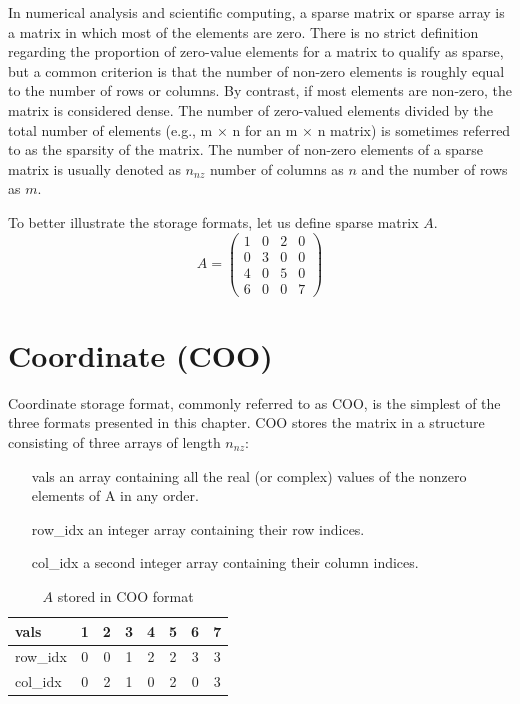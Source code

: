 \documentclass[thesis=M,english]{FITthesis}[2019/12/23]
\begin{document}
In numerical analysis and scientific computing, a sparse matrix or sparse array
is a matrix in which most of the elements are zero. There is no strict definition
regarding the proportion of zero-value elements for a matrix to qualify as sparse,
but a common criterion is that the number of non-zero elements is roughly equal
to the number of rows or columns. By contrast, if most elements are non-zero,
the matrix is considered dense.
The number of zero-valued elements divided by the total number of elements (e.g., m × n for an m × n matrix) is sometimes referred to as the sparsity of the matrix.
\cite{efficientSDMM} The number of non-zero elements of a sparse matrix is usually denoted
as \(n_{nz}\) number of columns as \(n\) and the number of rows as \(m\).

To better illustrate the storage formats, let us define sparse matrix \(A\).
\begin{equation*}
    A =
    \begin{pmatrix}
        1 & 0 & 2 & 0 \\
        0 & 3 & 0 & 0 \\
        4 & 0 & 5 & 0 \\
        6 & 0 & 0 & 7
    \end{pmatrix}
\end{equation*}

\section{Coordinate (COO)}\label{smsf:coo}

Coordinate storage format, commonly referred to as COO, is the simplest of the three formats presented in this
chapter. COO stores the matrix in a structure consisting of three arrays of length $n_{nz}$\cite{saad03:IMS}:

\begin{enumerate}
    \itemsep=0em
    \item[vals] an array containing all the real (or complex) values of the nonzero elements of A in any order.
    \item[row\_idx] an integer array containing their row indices.
    \item[col\_idx] a second integer array containing their column indices.
\end{enumerate}

\begin{table}[h!]
    \centering
    \begin{tabular}{ |l||c|c|c|c|c|c|c| }
        \hline
        vals     & 1 & 2 & 3 & 4 & 5 & 6 & 7 \\
        \hline
        row\_idx & 0 & 0 & 1 & 2 & 2 & 3 & 3 \\
        \hline
        col\_idx & 0 & 2 & 1 & 0 & 2 & 0 & 3 \\
        \hline
    \end{tabular}
    \caption{$A$ stored in COO format}
\end{table}
\end{document}
